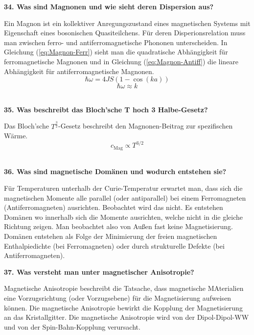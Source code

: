\noindent\textbf{34. Was sind Magnonen und wie sieht deren Dispersion aus?}\\
\begin{addmargin}[25pt]{0pt}
Ein Magnon ist ein kollektiver Anregungszustand eines magnetischen Systems mit Eigenschaft eines bosonischen Quasiteilchens. Für deren Disperionsrelation muss man zwischen ferro- und antiferromagnetische Phononen unterscheiden. In Gleichung (\ref{eq:Magnon-Ferr}) sieht man die quadratische Abhängigkeit für ferromagnetische Magnonen und in Gleichung (\ref{eq:Magnon-Antiff}) die lineare Abhängigkeit für antiferromagnetische Magnonen.
\begin{equation}
    \hbar \omega = 4JS(1-\cos(ka))
    \label{eq:Magnon-Ferr}
\end{equation}
\begin{equation}
    \hbar \omega \approx k
    \label{eq:Magnon-Antiff}
\end{equation}\\
\end{addmargin}

\noindent\textbf{35. Was beschreibt das Bloch'sche T hoch 3 Halbe-Gesetz?}\\
\begin{addmargin}[25pt]{0pt}
Das Bloch'sche $T^{\frac{3}{2}}$-Gesetz beschreibt den Magnonen-Beitrag zur spezifischen Wärme.
\begin{equation}
    c_{\text{Mag}} \propto T^{3/2}
    \label{eq:Bloch-T-Ges}
\end{equation}\\
\end{addmargin}

\noindent\textbf{36. Was sind magnetische Domänen und wodurch entstehen sie?}\\
\begin{addmargin}[25pt]{0pt}
Für Temperaturen unterhalb der Curie-Temperatur erwartet man, dass sich die magnetischen Momente alle parallel (oder antiparallel) bei einem Ferromagneten (Antiferromagneten) ausrichten. Beobachtet wird das nicht. Es entstehen Domänen wo innerhalb sich die Momente ausrichten, welche nicht in die gleiche Richtung zeigen. Man beobachtet also von Außen fast keine Magnetisierung. Domänen entstehen als Folge der Minimierung der freien magnetischen Enthalpiedichte (bei Ferromagneten) oder durch strukturelle Defekte (bei Antiferromagneten).\\
\end{addmargin}

\noindent\textbf{37. Was versteht man unter magnetischer Anisotropie?}\\
\begin{addmargin}[25pt]{0pt}
Magnetische Anisotropie beschreibt die Tatsache, dass magnetische MAterialien eine Vorzugsrichtung (oder Vorzugsebene) für die Magnetisierung aufweisen können. Die magnetische Anisotropie bewirkt die Kopplung der Magnetisierung an das Kristallgitter. Die magnetische Anisotropie wird von der Dipol-Dipol-WW und von der Spin-Bahn-Kopplung verursacht.\\
\end{addmargin}


